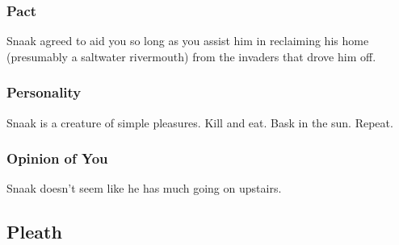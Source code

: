 \documentclass[letterpaper,10pt,twoside,twocolumn,openany]{book}
\begin{document}
\subsubsection{Pact}
Snaak agreed to aid you so long as you assist him in reclaiming his home (presumably a saltwater rivermouth) from the invaders that drove him off.

\subsubsection{Personality}
Snaak is a creature of simple pleasures.
Kill and eat. 
Bask in the sun.
Repeat.

\subsubsection{Opinion of You}
Snaak doesn't seem like he has much going on upstairs. 





\subsection{ Pleath}
\end{document}

